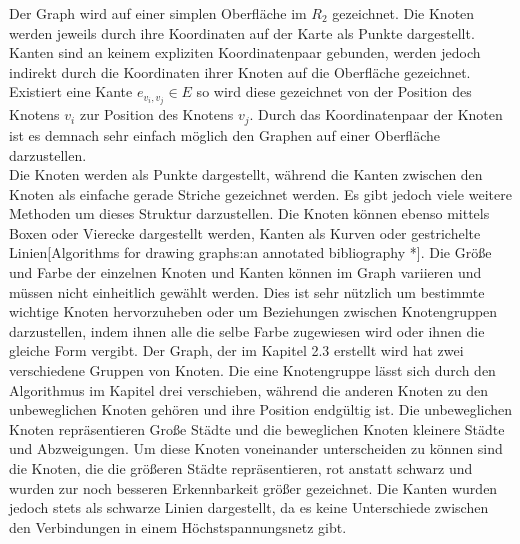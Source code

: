 Der Graph wird auf einer simplen Oberfläche im $R_{2}$ gezeichnet. Die Knoten werden jeweils durch ihre Koordinaten auf der Karte als Punkte dargestellt. Kanten sind an keinem expliziten Koordinatenpaar gebunden, werden jedoch indirekt durch die Koordinaten ihrer Knoten auf die Oberfläche gezeichnet. Existiert eine Kante $e_{v_{i},v_{j}} \in E$ so wird diese gezeichnet von der Position des Knotens $v_{i}$ zur Position des Knotens $v_{j}$. Durch das Koordinatenpaar der Knoten ist es demnach sehr einfach möglich den Graphen auf einer Oberfläche darzustellen. \\

Die Knoten werden als Punkte dargestellt, während die Kanten zwischen den Knoten als einfache gerade Striche gezeichnet werden. Es gibt jedoch viele weitere Methoden um dieses Struktur darzustellen. Die Knoten können ebenso mittels Boxen oder Vierecke dargestellt werden, Kanten als Kurven oder gestrichelte Linien[Algorithms for drawing graphs:an annotated bibliography *]. Die Größe und Farbe der einzelnen Knoten und Kanten können im Graph variieren und müssen nicht einheitlich gewählt werden. Dies ist sehr nützlich um bestimmte wichtige Knoten hervorzuheben oder um Beziehungen zwischen Knotengruppen darzustellen, indem ihnen alle die selbe Farbe zugewiesen wird oder ihnen die gleiche Form vergibt. Der Graph, der im Kapitel 2.3 erstellt wird hat zwei verschiedene Gruppen von Knoten. Die eine Knotengruppe lässt sich durch den Algorithmus im Kapitel drei verschieben, während die anderen Knoten zu den unbeweglichen Knoten gehören und ihre Position endgültig ist. Die unbeweglichen Knoten repräsentieren Große Städte und die beweglichen Knoten kleinere Städte und Abzweigungen. Um diese Knoten voneinander unterscheiden zu können sind die Knoten, die die größeren Städte repräsentieren, rot anstatt schwarz
 und wurden zur noch besseren Erkennbarkeit größer gezeichnet. Die Kanten wurden jedoch stets als schwarze Linien dargestellt, da es keine Unterschiede zwischen den Verbindungen in einem Höchstspannungsnetz gibt. 

